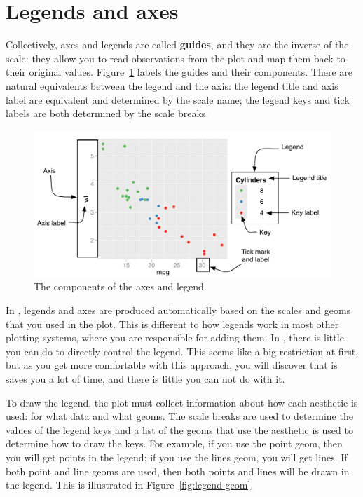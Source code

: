 \section{Legends and axes}
\label{sec:guides}

Collectively, axes and legends are called {\bf guides}, and they are the inverse of the scale: they allow you to read observations from the plot and map them back to their original values.  Figure~\ref{fig:labelled-guides} labels the guides and their components.  There are natural equivalents between the legend and the axis: the legend title and axis label are equivalent and determined by the scale name; the legend keys and tick labels are both determined by the scale breaks.

\begin{figure}[htbp]
  \centering
  \includegraphics[width=\linewidth]{scale-guides}
  
  \caption{The components of the axes and legend.}
  \label{fig:labelled-guides}
\end{figure}

In \ggplot, legends and axes are produced automatically based on the scales and geoms that you used in the plot. This is different to how legends work in most other plotting systems, where you are responsible for adding them.  In \ggplot, there is little you can do to directly control the legend.  This seems like a big restriction at first, but as you get more comfortable with this approach, you will discover that is saves you a lot of time, and there is little you can not do with it.

To draw the legend, the plot must collect information about how each aesthetic is used: for what data and what geoms. The scale breaks are used to determine the values of the legend keys and a list of the geoms that use the aesthetic  is used to determine how to draw the keys. For example, if you use the point geom, then you will get points in the legend; if you use the lines geom, you will get lines. If both point and line geoms are used, then both points and lines will be drawn in the legend.  This is illustrated in Figure~\ref{fig:legend-geom}.

